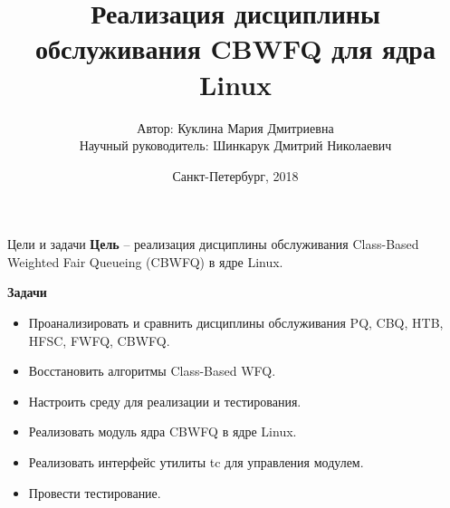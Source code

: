 \documentclass[12pt]{beamer}
\title[Реализация CBWFQ в ядре Linux]{Реализация дисциплины обслуживания CBWFQ для ядра Linux\\}
\author[]{{\small Автор: Куклина Мария Дмитриевна\\ Научный руководитель: Шинкарук Дмитрий Николаевич\\}}
\institute[]{Университет ИТМО}
\date[]{Санкт-Петербург, 2018}
\begin{document}
\setcounter{figure}{0}

\newcommand{\mc}[0]{\makecell}
\newcommand\setrow[1]{\gdef\rowmac{#1}#1\ignorespaces}
\newcommand\clearrow{\global\let\rowmac\relax}
\clearrow

\begin{darkbars}
    \begin{frame}
        \titlepage
    \end{frame}
\end{darkbars}

\begin{frame}{Цели и задачи}
    \textbf{Цель} -- реализация дисциплины обслуживания Class-Based Weighted Fair Queueing
    (CBWFQ) в ядре Linux. \newline

    \textbf{Задачи}
    {\small
        \begin{itemize}

    \item Проанализировать и сравнить дисциплины обслуживания PQ, CBQ, HTB, HFSC, FWFQ, CBWFQ.
    \item Восстановить алгоритмы Class-Based WFQ.
    \item Настроить среду для реализации и тестирования.
    \item Реализовать модуль ядра CBWFQ в ядре Linux.
    \item Реализовать интерфейс утилиты tc для управления модулем.
    \item Провести тестирование.
        \end{itemize}
    }
\end{frame}
\end{document}
